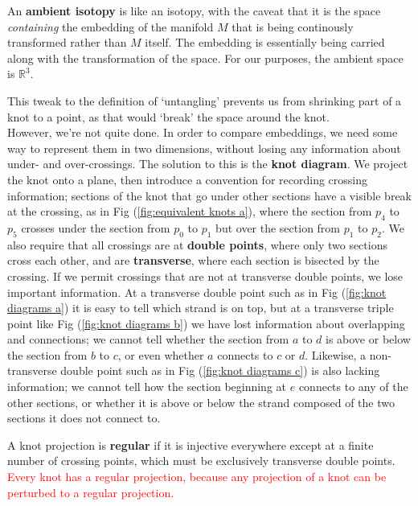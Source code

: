 \documentclass{article}
\begin{document}
\begin{definition}[] An \textbf{ambient isotopy} is like an isotopy, with the caveat that it is the space \emph{containing} the embedding of the manifold $M$ that is being continously transformed rather than $M$ itself. The embedding is essentially being carried along with the transformation of the space. For our purposes, the ambient space is $\mathbb{R}^3$.
\end{definition}
This tweak to the definition of `untangling' prevents us from shrinking part of a knot to a point, as that would `break' the space around the knot.\\

However, we're not quite done. In order to compare embeddings, we need some way to represent them in two dimensions, without losing any information about under- and over-crossings. The solution to this is the \textbf{knot diagram}. We project the knot onto a plane, then introduce a convention for recording crossing information; sections of the knot that go under other sections have a visible break at the crossing, as in Fig (\ref{fig:equivalent knots a}), where the section from $p_4$ to $p_5$ crosses under the section from $p_0$ to $p_1$ but over the section from $p_1$ to $p_2$. We also require that all crossings are at \textbf{double points}, where only two sections cross each other, and are \textbf{transverse}, where each section is bisected by the crossing. If we permit crossings that are not at transverse double points, we lose important information. At a transverse double point such as in Fig (\ref{fig:knot diagrams a}) it is easy to tell which strand is on top, but at a transverse triple point like Fig (\ref{fig:knot diagrams b}) we have lost information about overlapping and connections; we cannot tell whether the section from $a$ to $d$ is above or below the section from $b$ to $c$, or even whether $a$ connects to $c$ or $d$. Likewise, a non-transverse double point such as in Fig (\ref{fig:knot diagrams c}) is also lacking information; we cannot tell how the section beginning at $e$ connects to any of the other sections, or whether it is above or below the strand composed of the two sections it does not connect to.\\
\begin{definition}[] A knot projection is \textbf{regular} if it is injective everywhere except at a finite number of crossing points, which must be exclusively transverse double points. \textcolor{red}{Every knot has a regular projection, because any projection of a knot can be perturbed to a regular projection.}\\
\end{definition}
\end{document}
